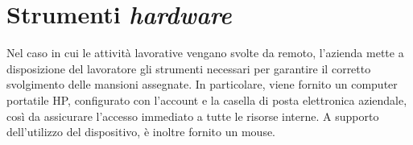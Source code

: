 \section{Strumenti \textit{hardware}}
Nel caso in cui le attività lavorative vengano svolte da remoto, l'azienda mette a disposizione del lavoratore gli strumenti necessari per garantire il corretto svolgimento delle mansioni assegnate.
In particolare, viene fornito un computer portatile HP, configurato con l'account e la casella di posta elettronica aziendale, così da assicurare l'accesso immediato a tutte le risorse interne.
A supporto dell'utilizzo del dispositivo, è inoltre fornito un mouse.